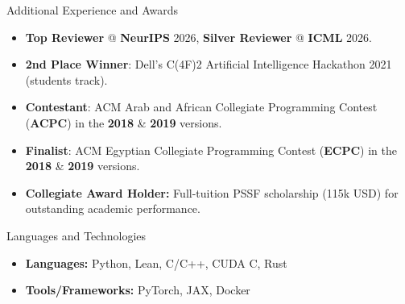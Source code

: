 \documentclass[]{mcdowellcv}
\begin{document}
        \vspace{-0.5em}

        \vspace{-0.5em}
	\begin{cvsection}{Additional Experience and Awards}
		\begin{cvsubsection}{}{}{}	
			\begin{itemize}
				\item \textbf{Top Reviewer} @ \textbf{NeurIPS} 2026, \textbf{Silver Reviewer} @ \textbf{ICML} 2026.
                \item \textbf{2nd Place Winner}: Dell's C(4F)2 Artificial Intelligence Hackathon 2021 (students track).
                \item \textbf{Contestant}: ACM Arab and African Collegiate Programming Contest (\textbf{ACPC}) in the \textbf{2018} \& \textbf{2019} versions.
				\item \textbf{Finalist}: ACM Egyptian Collegiate Programming Contest (\textbf{ECPC}) in the \textbf{2018} \& \textbf{2019} versions.
				\item \textbf{Collegiate Award Holder:} Full-tuition PSSF scholarship (115k USD) for outstanding academic performance.
			\end{itemize}
		\end{cvsubsection}
	\end{cvsection}
 
	\vspace{-0.5em}
	\begin{cvsection}{Languages and Technologies}
		\begin{cvsubsection}{}{}{}	
			\begin{itemize}
				\item \textbf{Languages:} Python, Lean, C/C++, CUDA C, Rust
				\item \textbf{Tools/Frameworks:} PyTorch, JAX, Docker
			\end{itemize}
		\end{cvsubsection}
	\end{cvsection}
        \vspace{-1em}
\end{document}
